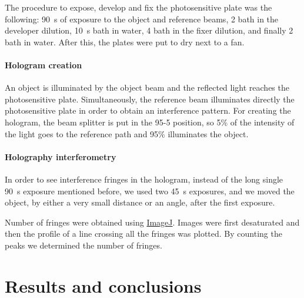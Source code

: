 \documentclass[11pt,a4paper]{article}
\begin{document}

The procedure to expose, develop and fix the photosensitive plate was the following: \SI{90}{\second} of exposure to the object and reference beams, \SI{2}{\min} bath in the developer dilution, \SI{10}{\second} bath in water, \SI{4}{\min} bath in the fixer dilution, and finally \SI{2}{\min} bath in water. After this, the plates were put to dry next to a fan.

\paragraph{Hologram creation}
An object is illuminated by the object beam and the reflected light reaches the photosensitive plate. Simultaneously, the reference beam illuminates directly the photosensitive plate in order to obtain an interference pattern. For creating the hologram, the beam splitter is put in the 95-5 position, so 5\% of the intensity of the light goes to the reference path and 95\% illuminates the object.

\paragraph{Holography interferometry}
In order to see interference fringes in the hologram, instead of the long single \SI{90}{\second} exposure mentioned before, we used two \SI{45}{\second} exposures, and we moved the object, by either a very small distance or an angle, after the first exposure.

Number of fringes were obtained using \href{https://imagej.net/}{ImageJ}. Images were first desaturated and then the profile of a line crossing all the fringes was plotted. By counting the peaks we determined the number of fringes.

\section{Results and conclusions}
\end{document}
